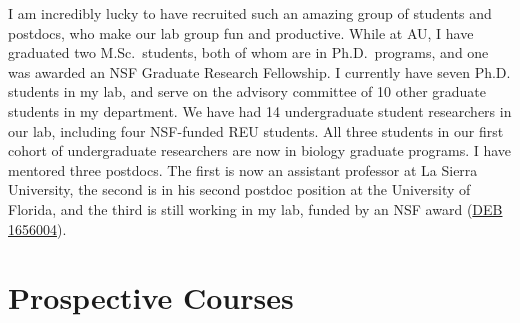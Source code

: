 I am incredibly lucky to have recruited such an amazing group of students and
postdocs, who make
our lab group fun and productive.
While at AU, I have graduated two M.Sc.\ students, both of whom are in Ph.D.\
programs, and one was awarded an NSF Graduate Research Fellowship.
I currently have seven Ph.D. students in my lab, and serve on the advisory
committee of 10 other graduate students in my department.
We have had 14 undergraduate student researchers in our lab, including four
NSF-funded REU students.
All three students in our first cohort of undergraduate researchers are now in
biology graduate programs.
I have mentored three postdocs.
The first is now an assistant professor at La Sierra University, the second is
in his second postdoc position at the University of Florida, and the third is
still working in my lab, funded by an NSF award
(\href{https://www.nsf.gov/awardsearch/showAward?AWD_ID=1656004&HistoricalAwards=false}{DEB 1656004}).


\section*{Prospective Courses}

